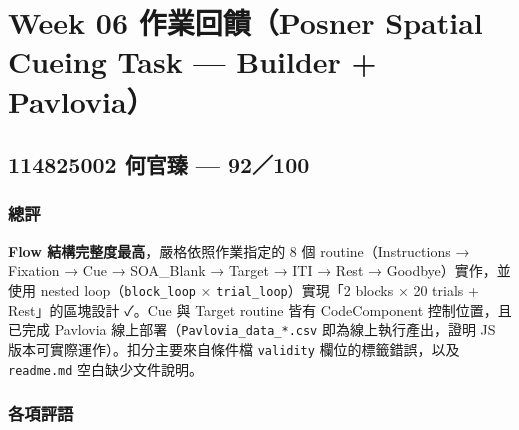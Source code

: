 \documentclass[14pt,]{extarticle}
\date{}
\begin{document}
\hypertarget{week-06-ux4f5cux696dux56deux994bposner-spatial-cueing-task-builder-pavlovia}{%
\section{Week 06 作業回饋（Posner Spatial Cueing Task --- Builder +
Pavlovia）}\label{week-06-ux4f5cux696dux56deux994bposner-spatial-cueing-task-builder-pavlovia}}

\hypertarget{ux4f55ux5b98ux81fb-92100}{%
\subsection{114825002 何官臻 ---
92／100}\label{ux4f55ux5b98ux81fb-92100}}

\hypertarget{ux7e3dux8a55}{%
\subsubsection{總評}\label{ux7e3dux8a55}}

\textbf{Flow 結構完整度最高}，嚴格依照作業指定的 8 個
routine（Instructions → Fixation → Cue → SOA\_Blank → Target → ITI →
Rest → Goodbye）實作，並使用 nested loop（\texttt{block\_loop} ×
\texttt{trial\_loop}）實現「2 blocks × 20 trials + Rest」的區塊設計
✓。Cue 與 Target routine 皆有 CodeComponent 控制位置，且已完成 Pavlovia
線上部署（\texttt{Pavlovia\_data\_*.csv} 即為線上執行產出，證明 JS
版本可實際運作）。扣分主要來自條件檔 \texttt{validity}
欄位的標籤錯誤，以及 \texttt{readme.md} 空白缺少文件說明。

\hypertarget{ux5404ux9805ux8a55ux8a9e}{%
\subsubsection{各項評語}\label{ux5404ux9805ux8a55ux8a9e}}
\end{document}
